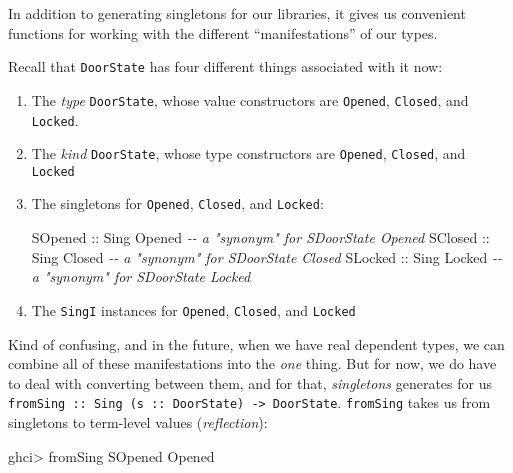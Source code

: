 \documentclass[]{article}
\newenvironment{Shaded}{}{}
\newcommand{\CommentTok}[1]{\textcolor[rgb]{0.38,0.63,0.69}{\textit{#1}}}
\newcommand{\DataTypeTok}[1]{\textcolor[rgb]{0.56,0.13,0.00}{#1}}
\newcommand{\NormalTok}[1]{#1}
\newcommand{\OperatorTok}[1]{\textcolor[rgb]{0.40,0.40,0.40}{#1}}
\newcommand{\OtherTok}[1]{\textcolor[rgb]{0.00,0.44,0.13}{#1}}
\begin{document}
In addition to generating singletons for our libraries, it gives us convenient
functions for working with the different ``manifestations'' of our types.

Recall that \texttt{DoorState} has four different things associated with it now:

\begin{enumerate}
\def\labelenumi{\arabic{enumi}.}
\item
  The \emph{type} \texttt{DoorState}, whose value constructors are
  \texttt{Opened}, \texttt{Closed}, and \texttt{Locked}.
\item
  The \emph{kind} \texttt{DoorState}, whose type constructors are
  \texttt{\textquotesingle{}Opened}, \texttt{\textquotesingle{}Closed}, and
  \texttt{\textquotesingle{}Locked}
\item
  The singletons for \texttt{\textquotesingle{}Opened},
  \texttt{\textquotesingle{}Closed}, and \texttt{\textquotesingle{}Locked}:

\begin{Shaded}
\begin{Highlighting}[]
\DataTypeTok{SOpened}\OtherTok{ ::} \DataTypeTok{Sing} \DataTypeTok{\textquotesingle{}Opened}             \CommentTok{{-}{-} a "synonym" for SDoorState \textquotesingle{}Opened}
\DataTypeTok{SClosed}\OtherTok{ ::} \DataTypeTok{Sing} \DataTypeTok{\textquotesingle{}Closed}             \CommentTok{{-}{-} a "synonym" for SDoorState \textquotesingle{}Closed}
\DataTypeTok{SLocked}\OtherTok{ ::} \DataTypeTok{Sing} \DataTypeTok{\textquotesingle{}Locked}             \CommentTok{{-}{-} a "synonym" for SDoorState \textquotesingle{}Locked}
\end{Highlighting}
\end{Shaded}
\item
  The \texttt{SingI} instances for \texttt{\textquotesingle{}Opened},
  \texttt{\textquotesingle{}Closed}, and
  \texttt{\textquotesingle{}Locked\textquotesingle{}}
\end{enumerate}

Kind of confusing, and in the future, when we have real dependent types, we can
combine all of these manifestations into the \emph{one} thing. But for now, we
do have to deal with converting between them, and for that, \emph{singletons}
generates for us
\texttt{fromSing\ ::\ Sing\ (s\ ::\ DoorState)\ -\textgreater{}\ DoorState}.
\texttt{fromSing} takes us from singletons to term-level values
(\emph{reflection}):

\begin{Shaded}
\begin{Highlighting}[]
\NormalTok{ghci}\OperatorTok{\textgreater{}}\NormalTok{ fromSing }\DataTypeTok{SOpened}
\DataTypeTok{Opened}
\end{Highlighting}
\end{Shaded}
\end{document}

